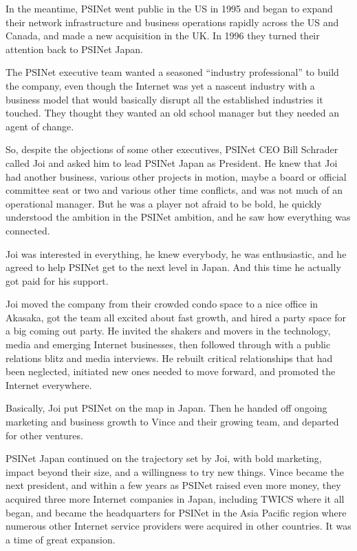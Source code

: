 In the meantime, PSINet went public in the US in 1995 and began to expand their network infrastructure and business operations rapidly across the US and Canada, and made a new acquisition in the UK. In 1996 they turned their attention back to PSINet Japan.

The PSINet executive team wanted a seasoned ``industry professional'' to build the company, even though the Internet was yet a nascent industry with a business model that would basically disrupt all the established industries it touched. They thought they wanted an old school manager but they needed an agent of change.

So, despite the objections of some other executives, PSINet CEO Bill Schrader called Joi and asked him to lead PSINet Japan as President. He knew that Joi had another business, various other projects in motion, maybe a board or official committee seat or two and various other time conflicts, and was not much of an operational manager. But he was a player not afraid to be bold, he quickly understood the ambition in the PSINet ambition, and he saw how everything was connected.

Joi was interested in everything, he knew everybody, he was enthusiastic, and he agreed to help PSINet get to the next level in Japan. And this time he actually got paid for his support.

Joi moved the company from their crowded condo space to a nice office in Akasaka, got the team all excited about fast growth, and hired a party space for a big coming out party. He invited the shakers and movers in the technology, media and emerging Internet businesses, then followed through with a public relations blitz and media interviews. He rebuilt critical relationships that had been neglected, initiated new ones needed to move forward, and promoted the Internet everywhere.

Basically, Joi put PSINet on the map in Japan. Then he handed off ongoing marketing and business growth to Vince and their growing team, and departed for other ventures.

PSINet Japan continued on the trajectory set by Joi, with bold marketing, impact beyond their size, and a willingness to try new things. Vince became the next president, and within a few years as PSINet raised even more money, they acquired three more Internet companies in Japan, including TWICS where it all began, and became the headquarters for PSINet in the Asia Pacific region where numerous other Internet service providers were acquired in other countries. It was a time of great expansion.

